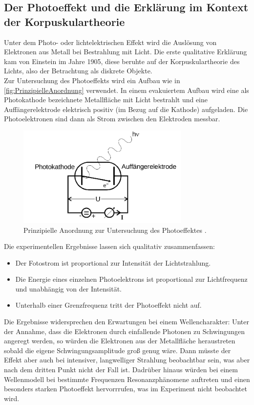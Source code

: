 \subsection{Der Photoeffekt und die Erklärung im Kontext der Korpuskulartheorie}
\label{sec:Der Photoeffekt und die Erklärung im Kontext der Korpuskulartheorie}
Unter dem Photo- oder lichtelektrischen Effekt wird die Auslösung von Elektronen aus
Metall bei Bestrahlung mit Licht. Die erste qualitative Erklärung kam von Einstein im
Jahre 1905, diese beruhte auf der Korpuskulartheorie des Lichts, also der Betrachtung als
diskrete Objekte.
\\
Zur Untersuchung des Photoeffekts wird ein Aufbau wie in
\autoref{fig:PrinzipielleAnordnung} verwendet. In einem evakuiertem Aufbau wird eine als
Photokathode bezeichnete Metallfläche mit Licht bestrahlt und eine Auffängerelektrode
elektrisch positiv (im Bezug auf die Kathode) aufgeladen. Die Photoelektronen sind dann
als Strom zwischen den Elektroden messbar.
\begin{figure}
	\centering
	\includegraphics[height=5cm]{pictures/PrinzipielleAnordnung.png}
	\caption{Prinzipielle Anordnung zur Untersuchung des Photoeffektes
	\cite{anleitung}.}
	\label{fig:PrinzipielleAnordnung}
\end{figure}
Die experimentellen Ergebnisse lassen sich qualitativ zusammenfassen:
\begin{itemize}
	\item Der Fotostrom ist proportional zur Intensität der Lichtstrahlung.
	\item Die Energie eines einzelnen Photoelektrons ist proportional zur
		Lichtfrequenz und unabhängig von der Intensität.
	\item Unterhalb einer Grenzfrequenz tritt der Photoeffekt nicht auf.
\end{itemize}
Die Ergebnisse widersprechen den Erwartungen bei einem Wellencharakter: Unter der Annahme,
dass die Elektronen durch einfallende Photonen zu Schwingungen angeregt werden, so würden
die Elektronen aus der Metallfläche heraustreten sobald die eigene Schwingungsamplitude groß
genug wäre. Dann müsste der Effekt aber auch  bei intensiver, langwelliger Strahlung
beobachtbar sein, was aber nach dem dritten Punkt nicht der Fall ist. Dadrüber hinaus
würden bei einem Wellenmodell bei bestimmte Frequenzen Resonanzphänomene auftreten und einen 
besonders starken Photoeffekt hervorrrufen, was im Experiment nicht beobachtet wird.

